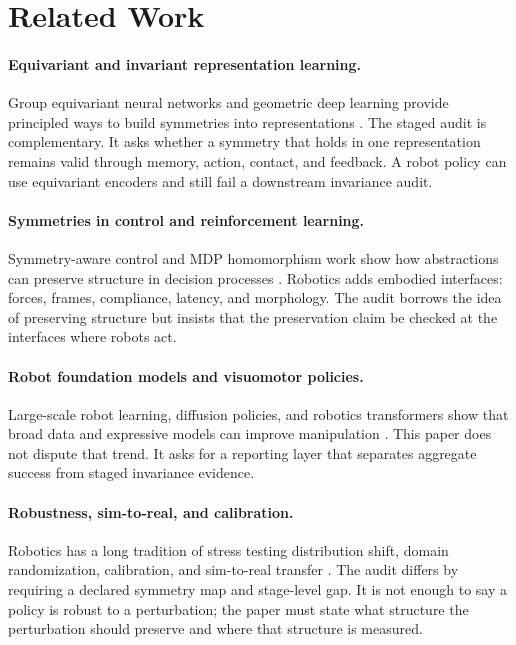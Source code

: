 \documentclass{article}
\begin{document}
\section{Related Work}

\paragraph{Equivariant and invariant representation learning.}
Group equivariant neural networks and geometric deep learning provide principled ways to build symmetries into representations \citep{cohen2016group, bronstein2021geometric}. The staged audit is complementary. It asks whether a symmetry that holds in one representation remains valid through memory, action, contact, and feedback. A robot policy can use equivariant encoders and still fail a downstream invariance audit.

\paragraph{Symmetries in control and reinforcement learning.}
Symmetry-aware control and MDP homomorphism work show how abstractions can preserve structure in decision processes \citep{ravindran2004symmetries, van2018theory}. Robotics adds embodied interfaces: forces, frames, compliance, latency, and morphology. The audit borrows the idea of preserving structure but insists that the preservation claim be checked at the interfaces where robots act.

\paragraph{Robot foundation models and visuomotor policies.}
Large-scale robot learning, diffusion policies, and robotics transformers show that broad data and expressive models can improve manipulation \citep{chi2023diffusion, brohan2023rt1, brohan2023rt2}. This paper does not dispute that trend. It asks for a reporting layer that separates aggregate success from staged invariance evidence.

\paragraph{Robustness, sim-to-real, and calibration.}
Robotics has a long tradition of stress testing distribution shift, domain randomization, calibration, and sim-to-real transfer \citep{tobin2017domain, peng2018sim, dulacarnold2021empirical}. The audit differs by requiring a declared symmetry map and stage-level gap. It is not enough to say a policy is robust to a perturbation; the paper must state what structure the perturbation should preserve and where that structure is measured.
\end{document}
